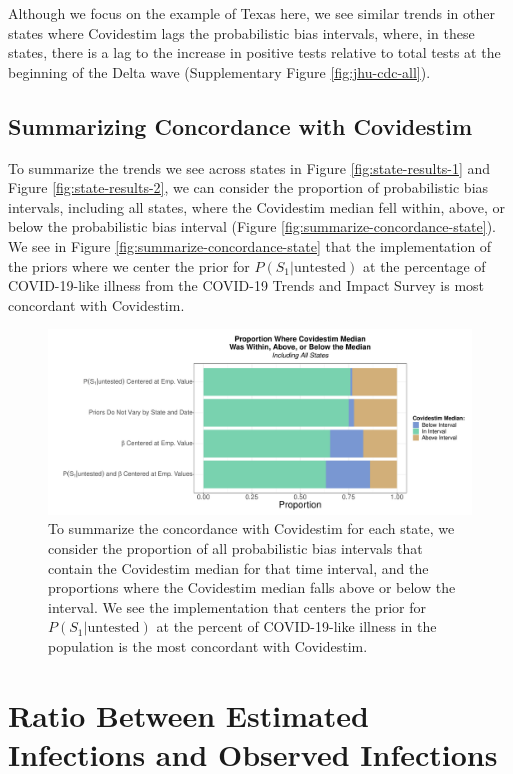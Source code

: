 \documentclass[12pt,twoside]{smiththesis}
\begin{document}
Although we focus on the example of Texas here, we see similar trends in other states where Covidestim lags the probabilistic bias intervals, where, in these states, there is a lag to the increase in positive tests relative to total tests at the beginning of the Delta wave (Supplementary Figure \ref{fig:jhu-cdc-all}).

\hypertarget{summarizing-concordance-with-covidestim}{%
\subsection{Summarizing Concordance with Covidestim}\label{summarizing-concordance-with-covidestim}}

To summarize the trends we see across states in Figure \ref{fig:state-results-1} and Figure \ref{fig:state-results-2}, we can consider the proportion of probabilistic bias intervals, including all states, where the Covidestim median fell within, above, or below the probabilistic bias interval (Figure \ref{fig:summarize-concordance-state}). We see in Figure \ref{fig:summarize-concordance-state} that the implementation of the priors where we center the prior for \(P(S_1|\text{untested})\) at the percentage of COVID-19-like illness from the COVID-19 Trends and Impact Survey is most concordant with Covidestim.
\begin{figure}
\includegraphics[width=1\linewidth]{figure/covidestim_concordance_state} \caption{\label{fig:summarize-concordance-state} To summarize the concordance with Covidestim for each state, we consider the proportion of all probabilistic bias intervals that contain the Covidestim median for that time interval, and the proportions where the Covidestim median falls above or below the interval. We see the implementation that centers the prior for $P(S_1|\text{untested})$ at the percent of COVID-19-like illness in the population is the most concordant with Covidestim.}\label{fig:unnamed-chunk-69}
\end{figure}
\hypertarget{ratio-between-estimated-infections-and-observed-infections}{%
\section{Ratio Between Estimated Infections and Observed Infections}\label{ratio-between-estimated-infections-and-observed-infections}}
\end{document}
